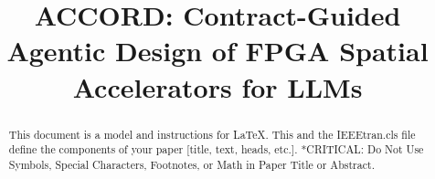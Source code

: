 \documentclass[conference]{IEEEtran}
\begin{document}
\title{ACCORD: Contract-Guided Agentic Design of FPGA Spatial Accelerators for LLMs\\
}


\maketitle

\begin{abstract}
This document is a model and instructions for \LaTeX.
This and the IEEEtran.cls file define the components of your paper [title, text, heads, etc.]. *CRITICAL: Do Not Use Symbols, Special Characters, Footnotes, 
or Math in Paper Title or Abstract.
\end{abstract}
\end{document}
